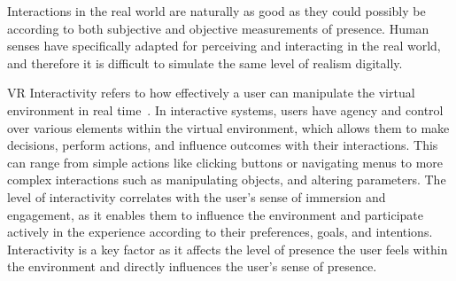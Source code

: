 Interactions in the real world are naturally as good as they could possibly be according to both subjective and objective measurements of presence.
Human senses have specifically adapted for perceiving and interacting in the real world, and therefore it is difficult to simulate the same level of realism digitally.

VR Interactivity refers to how effectively a user can manipulate the virtual environment in real time~\cite{Steuer2000}.
In interactive systems, users have agency and control over various elements within the virtual environment, which allows them to make decisions, perform actions, and influence outcomes with their interactions.
This can range from simple actions like clicking buttons or navigating menus to more complex interactions such as manipulating objects, and altering parameters. 
The level of interactivity correlates with the user's sense of immersion and engagement, as it enables them to influence the environment and participate actively in the experience according to their preferences, goals, and intentions.
Interactivity is a key factor as it affects the level of presence the user feels within the environment and directly influences the user's sense of presence. 
 

